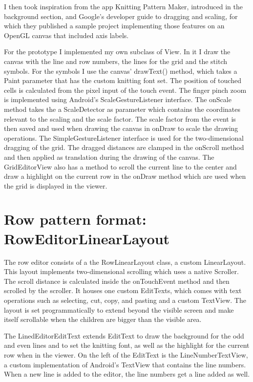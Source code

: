 \documentclass[a4paper,11pt]{kth-mag}
\begin{document}
I then took inspiration from the app Knitting Pattern Maker, introduced in the background section, and Google’s developer guide to dragging and scaling, for which they published a sample project implementing those features on an OpenGL canvas that included axis labels.

For the prototype I implemented my own subclass of View. In it I draw the canvas with the line and row numbers, the lines for the grid and the stitch symbols. For the symbols I use the canvas’ drawText() method, which takes a Paint parameter that has the custom knitting font set. The position of touched cells is calculated from the pixel input of the touch event. The finger pinch zoom is implemented using Android’s ScaleGestureListener interface. The onScale method takes the a ScaleDetector as parameter which contains the coordinates relevant to the scaling and the scale factor. The scale factor from the event is then saved and used when drawing the canvas in onDraw to scale the drawing operations. The SimpleGestureListener interface is used for the two-dimensional dragging of the grid. The dragged distances are clamped in the onScroll method and then applied as translation during the drawing of the canvas.
The GridEditorView also has a method to scroll the current line to the center and draw a highlight on the current row in the onDraw method which are used when the grid is displayed in the viewer.

\section{Row pattern format: RowEditorLinearLayout}
The row editor consists of a the RowLinearLayout class, a custom LinearLayout. This layout implements two-dimensional scrolling which uses a native Scroller. The scroll distance is calculated inside the onTouchEvent method and then scrolled by the scroller. It houses one custom EditTexts, which comes with text operations such as selecting, cut, copy, and pasting and a custom TextView. The layout is set programmatically to extend beyond the visible screen and make itself scrollable when the children are bigger than the visible area.

The LinedEditorEditText extends EditText to draw the background for the odd and even lines and to set the knitting font, as well as the highlight for the current row when in the viewer. On the left of the EditText is the LineNumberTextView, a custom implementation of Android’s TextView that contains the line numbers. When a new line is added to the editor, the line numbers get a line added as well.
\end{document}
